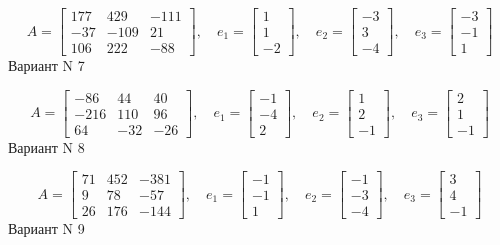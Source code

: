 \documentclass[11pt]{report}
\begin{document}
$$A = \left[\begin{matrix}177 & 429 & -111\\-37 & -109 & 21\\106 & 222 & -88\end{matrix}\right],\quad e_1 = \left[\begin{matrix}1\\1\\-2\end{matrix}\right],\quad e_2 = \left[\begin{matrix}-3\\3\\-4\end{matrix}\right],\quad e_3 = \left[\begin{matrix}-3\\-1\\1\end{matrix}\right]$$Вариант N 7

$$A = \left[\begin{matrix}-86 & 44 & 40\\-216 & 110 & 96\\64 & -32 & -26\end{matrix}\right],\quad e_1 = \left[\begin{matrix}-1\\-4\\2\end{matrix}\right],\quad e_2 = \left[\begin{matrix}1\\2\\-1\end{matrix}\right],\quad e_3 = \left[\begin{matrix}2\\1\\-1\end{matrix}\right]$$Вариант N 8

$$A = \left[\begin{matrix}71 & 452 & -381\\9 & 78 & -57\\26 & 176 & -144\end{matrix}\right],\quad e_1 = \left[\begin{matrix}-1\\-1\\1\end{matrix}\right],\quad e_2 = \left[\begin{matrix}-1\\-3\\-4\end{matrix}\right],\quad e_3 = \left[\begin{matrix}3\\4\\-1\end{matrix}\right]$$Вариант N 9
\end{document}
